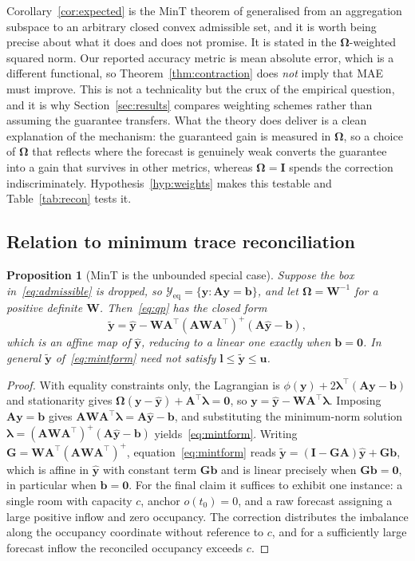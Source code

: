 \documentclass[utf8]{FrontiersinHarvard}
\newif\ifrevisionmarkup
\newcommand{\new}[1]{\ifrevisionmarkup\textcolor{revision}{#1}\else#1\fi}
\theoremstyle{plain}
\newtheorem{proposition}[theorem]{Proposition}
\theoremstyle{definition}
\theoremstyle{remark}
\newcommand{\bA}{\bm{A}}
\newcommand{\by}{\bm{y}}
\newcommand{\bb}{\bm{b}}
\newcommand{\bOm}{\bm{\Omega}}
\newcommand{\yhat}{\hat{\by}}
\newcommand{\ytil}{\tilde{\by}}
\newcommand{\cY}{\mathcal{Y}}
\begin{document}
Corollary~\ref{cor:expected} is the MinT theorem of \citet{wickramasuriya2019mint} generalised from an aggregation subspace to an arbitrary closed convex admissible set, and it is worth being precise about what it does and does not promise. It is stated in the $\bOm$-weighted squared norm. Our reported accuracy metric is mean absolute error, which is a different functional, so Theorem~\ref{thm:contraction} does \emph{not} imply that MAE must improve. This is not a technicality but the crux of the empirical question, and it is why Section~\ref{sec:results} compares weighting schemes rather than assuming the guarantee transfers. What the theory does deliver is a clean explanation of the mechanism: the guaranteed gain is measured in $\bOm$, so a choice of $\bOm$ that reflects where the forecast is genuinely weak converts the guarantee into a gain that survives in other metrics, whereas $\bOm = \bm{I}$ spends the correction indiscriminately. Hypothesis~\ref{hyp:weights} makes this testable and Table~\ref{tab:recon} tests it.

\subsection{Relation to minimum trace reconciliation}

\begin{proposition}[MinT is the unbounded special case]
\label{prop:mint}
Suppose the box in~\eqref{eq:admissible} is dropped, so $\cY_{\mathrm{eq}} = \{\by : \bA\by=\bb\}$, and let $\bOm = \bm{W}^{-1}$ for a positive definite $\bm{W}$. Then~\eqref{eq:qp} has the closed form
\begin{equation}
\ytil = \yhat - \bm{W}\bA^{\top}\left(\bA\bm{W}\bA^{\top}\right)^{+}\left(\bA\yhat - \bb\right),
\label{eq:mintform}
\end{equation}
which is an \new{affine} map of $\yhat$, \new{reducing to a linear one exactly when $\bb = \bm{0}$}. In general $\ytil$ of~\eqref{eq:mintform} need not satisfy $\bm{l}\le\ytil\le\bm{u}$.
\end{proposition}
\begin{proof}
With equality constraints only, the Lagrangian is $\phi(\by) + 2\bm{\lambda}^{\top}(\bA\by-\bb)$ and stationarity gives $\bOm(\by-\yhat) + \bA^{\top}\bm{\lambda} = \bm{0}$, so $\by = \yhat - \bm{W}\bA^{\top}\bm{\lambda}$. Imposing $\bA\by=\bb$ gives $\bA\bm{W}\bA^{\top}\bm{\lambda} = \bA\yhat - \bb$, and substituting the minimum-norm solution $\bm{\lambda} = (\bA\bm{W}\bA^{\top})^{+}(\bA\yhat-\bb)$ yields~\eqref{eq:mintform}. \new{Writing $\bm{G} = \bm{W}\bA^{\top}(\bA\bm{W}\bA^{\top})^{+}$, equation~\eqref{eq:mintform} reads $\ytil = (\bm{I}-\bm{G}\bA)\yhat + \bm{G}\bb$, which is affine in $\yhat$ with constant term $\bm{G}\bb$ and is linear precisely when $\bm{G}\bb = \bm{0}$, in particular when $\bb = \bm{0}$.} For the final claim it suffices to exhibit one instance: a single room with capacity $c$, anchor $o(t_0)=0$, and a raw forecast assigning a large positive inflow and zero occupancy. The correction distributes the imbalance along the occupancy coordinate without reference to $c$, and for a sufficiently large forecast inflow the reconciled occupancy exceeds $c$.
\end{proof}
\end{document}
